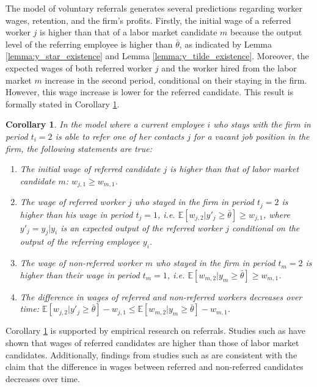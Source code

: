 \documentclass[12pt]{article}
\newtheorem{corollary}[theorem]{Corollary}
\begin{document}
The model of voluntary referrals generates several predictions regarding worker wages, retention, and the firm's profits. Firstly, the initial wage of a referred worker $j$ is higher than that of a labor market candidate $m$ because the output level of the referring employee is higher than $\bar{\theta}$, as indicated by Lemma \ref{lemma:y_star_existence} and Lemma \ref{lemma:y_tilde_existence}. Moreover, the expected wages of both referred worker $j$ and the worker hired from the labor market $m$ increase in the second period, conditional on their staying in the firm. However, this wage increase is lower for the referred candidate. This result is formally stated in Corollary \ref{cor:wages_vr}.

\begin{corollary}\label{cor:wages_vr}
    In the model where a current employee $i$ who stays with the firm in period $t_i = 2$ is able to refer one of her contacts $j$ for a vacant job position in the firm, the following statements are true:
    \begin{enumerate}[label={\roman*})]
        \item The initial wage of referred candidate $j$ is higher than that of labor market candidate $m$:
        $w_{j,1} \geq w_{m,1}$.
        \item The wage of referred worker $j$ who stayed in the firm in period $t_j = 2$ is higher than his wage in period $t_j = 1$, i.e. $\mathbb{E}[w_{j,2}|y'_j \geq \bar{\theta}] \geq w_{j,1}$, where $y'_j = y_j | y_i$ is an expected output of the referred worker $j$ conditional on the output of the referring employee $y_i$.
        \item The wage of non-referred worker $m$ who stayed in the firm in period $t_m = 2$ is higher than their wage in period $t_m = 1$, i.e. $\mathbb{E}[w_{m,2}|y_m \geq \bar{\theta}] \geq w_{m,1}$.
        \item The difference in wages of referred and non-referred workers decreases over time: $\mathbb{E}[w_{j,2}|y'_j \geq \bar{\theta}] - w_{j,1} \leq \mathbb{E}[w_{m,2}|y_m \geq \bar{\theta}]- w_{m,1}$.
    \end{enumerate}
\end{corollary}

Corollary \ref{cor:wages_vr} is supported by empirical research on referrals. Studies such as \cite{corcoran1980most, korenman1996employment, loury2006some} have shown that wages of referred candidates are higher than those of labor market candidates. Additionally, findings from studies such as \cite{montgomery1991social, simon1992matchmaker, dustmann2016referral} are consistent with the claim that the difference in wages between referred and non-referred candidates decreases over time.
\end{document}
